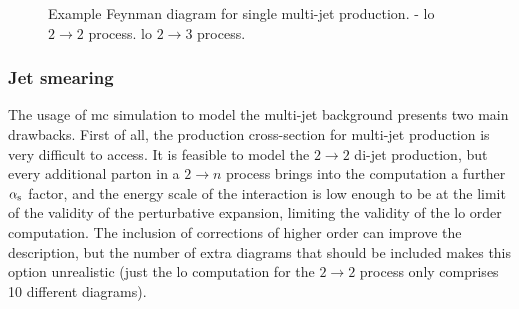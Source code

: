\begin{figure}[h]
\centering 
{}
\caption{Example Feynman diagram for single multi-jet production. - \gls{lo} $2 \to 2$ process. 
 \gls{lo} $2 \to 3$ process.}\label{fig:qcd_prod}
\end{figure}

\subsubsection*{Jet smearing}
\label{sec:jet_smearing}

The usage of \gls{mc} simulation to model the multi-jet background presents two main drawbacks.
First of all, the production cross-section for multi-jet production is very difficult to access. 
It is feasible to model the $2 \to 2$ di-jet production, 
but every additional parton in a $2 \to n$ process brings into the computation a further $\alpha_{\rm{s}}$ factor, 
and the energy scale of the interaction is low enough to be at the limit of the validity of the perturbative expansion, limiting the validity of the \gls{lo} order computation. The inclusion of corrections of higher order can improve the description, but the number of extra diagrams that should be included makes this option unrealistic (just the \gls{lo} computation for the $2 \to 2$ process only comprises 10 different diagrams).

